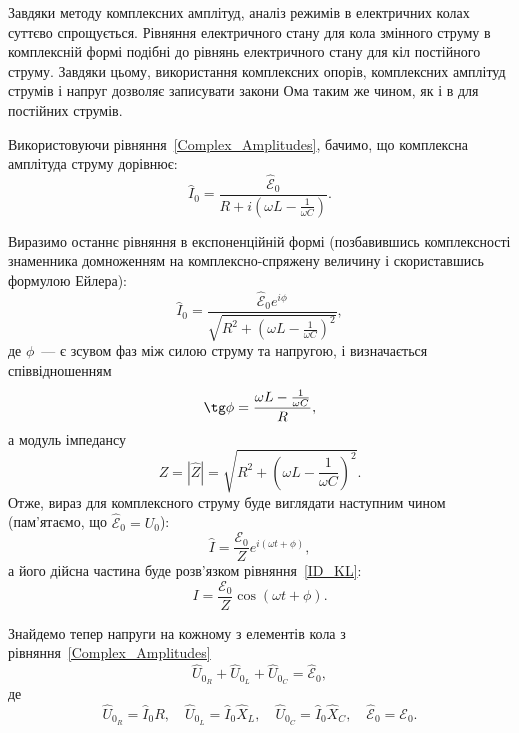 \documentclass[]{LabWork}
\begin{document}
\begin{More}

	Завдяки методу комплексних амплітуд, аналіз режимів в електричних колах суттєво спрощується. Рівняння електричного стану для кола змінного струму в комплексній формі подібні до рівнянь електричного стану для кіл постійного струму. Завдяки цьому, використання комплексних опорів, комплексних амплітуд струмів і напруг дозволяє записувати закони Ома таким же чином, як і в для постійних струмів.
\end{More}

Використовуючи рівняння~\eqref{Complex_Amplitudes}, бачимо, що комплексна амплітуда струму дорівнює:
\begin{equation}
	\hat{I}_0 = \frac{\hat{\mathcal{E}}_0}{R  +   i\left(  \omega L - \frac{1}{\omega C} \right)}.
\end{equation}

Виразимо останнє рівняння в експоненційній формі (позбавившись комплексності знаменника домноженням на комплексно-спряжену величину і скориставшись формулою Ейлера):
\begin{equation}
	\hat{I}_0 = \frac{\hat{\mathcal{E}}_0e^{i\phi}}{\sqrt{R^2  +   \left(  \omega L - \frac{1}{\omega C} \right)^2}},
\end{equation}
де $\phi$~--- є зсувом фаз між силою струму та напругою, і визначається співвідношенням
\begin{equation}\label{S-phase_shift}
	\tg\phi = \frac{\omega L - \frac{1}{\omega C}}{R},
\end{equation}
а модуль імпедансу
\begin{equation}
	Z = |\hat{Z}| = \sqrt{R^2  +   \left(  \omega L - \frac{1}{\omega C} \right)^2}.
\end{equation}
Отже, вираз для комплексного струму буде виглядати наступним чином (пам'ятаємо, що $\hat{\mathcal{E}}_0 = U_0$):
\begin{equation}\label{CI0}
	\hat{I}= \frac{\mathcal{E}_0}{Z}e^{i(\omega t + \phi)},
\end{equation}
а його дійсна частина буде розв'язком рівняння~\eqref{ID_KL}:
\begin{equation}
	I= \frac{\mathcal{E}_0}{Z}\cos(\omega t + \phi).
\end{equation}

Знайдемо тепер напруги на кожному з елементів кола з рівняння~\eqref{Complex_Amplitudes}
\begin{equation}\label{eq:S_sumU}
	\hat{U}_{0_R} + \hat{U}_{0_L} + \hat{U}_{0_C} = \hat{\mathcal{E}}_{0},
\end{equation}
де
\begin{equation*}
	\hat{U}_{0_R} = \hat{I}_{0} R, \quad \hat{U}_{0_L} = \hat{I}_{0} \hat{X}_L, \quad \hat{U}_{0_C} = \hat{I}_{0} \hat{X}_C , \quad \hat{\mathcal{E}}_{0} = \mathcal{E}_0.
\end{equation*}
\end{document}
